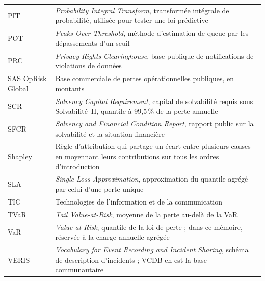\begin{center}
\begin{longtable}{@{}>{\raggedright\arraybackslash}p{2.6cm}>{\raggedright\arraybackslash}p{12.2cm}@{}}
PIT & \emph{Probability Integral Transform}, transformée intégrale de probabilité, utilisée pour tester une loi prédictive \\
POT & \emph{Peaks Over Threshold}, méthode d'estimation de queue par les dépassements d'un seuil \\
PRC & \emph{Privacy Rights Clearinghouse}, base publique de notifications de violations de données \\
SAS OpRisk Global & Base commerciale de pertes opérationnelles publiques, en montants \\
SCR & \emph{Solvency Capital Requirement}, capital de solvabilité requis sous Solvabilité~II, quantile à 99,5\,\% de la perte annuelle \\
SFCR & \emph{Solvency and Financial Condition Report}, rapport public sur la solvabilité et la situation financière \\
Shapley & Règle d'attribution qui partage un écart entre plusieurs causes en moyennant leurs contributions sur tous les ordres d'introduction \\
SLA & \emph{Single Loss Approximation}, approximation du quantile agrégé par celui d'une perte unique \\
TIC & Technologies de l'information et de la communication \\
TVaR & \emph{Tail Value-at-Risk}, moyenne de la perte au-delà de la VaR \\
VaR & \emph{Value-at-Risk}, quantile de la loi de perte ; dans ce mémoire, réservée à la charge annuelle agrégée \\
VERIS & \emph{Vocabulary for Event Recording and Incident Sharing}, schéma de description d'incidents ; VCDB en est la base communautaire \\
\bottomrule
\end{longtable}
\end{center}

